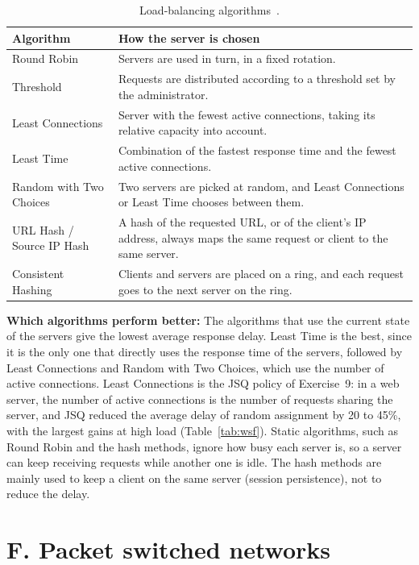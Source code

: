 ﻿\documentclass[12pt]{article}
\begin{document}
\begin{table}[H]
    \centering \small
    \caption{Load-balancing algorithms~\cite{f5-lb}.}
    \label{tab:nginx}
    \begin{tabular}{>{\raggedright\arraybackslash}p{3.6cm}>{\raggedright\arraybackslash}p{11.4cm}}
        \hline
        Algorithm & How the server is chosen \\
        \hline
        Round Robin & Servers are used in turn, in a fixed rotation. \\
        Threshold & Requests are distributed according to a threshold set by the administrator. \\
        Least Connections & Server with the fewest active connections, taking its relative capacity into account. \\
        Least Time & Combination of the fastest response time and the fewest active connections. \\
        Random with Two Choices & Two servers are picked at random, and Least Connections or Least Time chooses between them. \\
        URL Hash / Source IP Hash & A hash of the requested URL, or of the client's IP address, always maps the same request or client to the same server. \\
        Consistent Hashing & Clients and servers are placed on a ring, and each request goes to the next server on the ring. \\
        \hline
    \end{tabular}
\end{table}

\textbf{Which algorithms perform better:} The algorithms that use the current
state of the servers give the lowest average response delay. Least Time is the
best, since it is the only one that directly uses the response time of the
servers, followed by Least Connections and Random with Two Choices, which use
the number of active connections. Least Connections is the JSQ policy of
Exercise~9: in a web server, the number of active connections is the number of
requests sharing the server, and JSQ reduced the average delay of random
assignment by 20 to 45\%, with the largest gains at high load
(Table~\ref{tab:wsf}). Static algorithms, such as Round Robin and the hash
methods, ignore how busy each server is, so a server can keep receiving
requests while another one is idle. The hash methods are mainly used to keep a
client on the same server (session persistence), not to reduce the delay.

\section{F. Packet switched networks}\label{sec:F}
\end{document}
